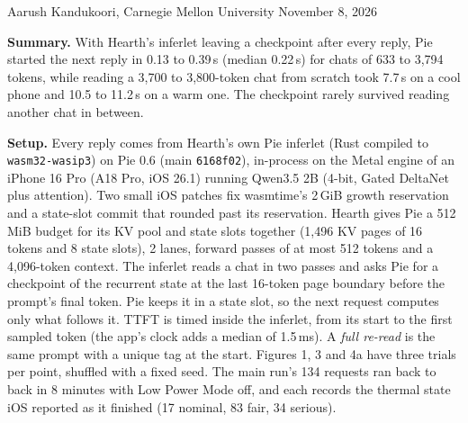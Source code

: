 \documentclass[10pt]{article}
\begin{document}
\fontsize{7.8pt}{9.1pt}\selectfont

\hfill{\scriptsize Aarush Kandukoori, Carnegie Mellon University \quad November 8, 2026}

\textbf{Summary.} With Hearth's inferlet leaving a checkpoint after every reply, Pie started the next reply in
0.13 to 0.39\,s (median 0.22\,s) for chats of
633 to 3,794 tokens, while reading a 3,700 to
3,800-token chat from scratch took 7.7\,s on a cool phone and 10.5 to 11.2\,s on a warm one. The checkpoint rarely
survived reading another chat in between.

\textbf{Setup.} Every reply comes from Hearth's own Pie inferlet (Rust compiled to \texttt{wasm32-wasip3}) on Pie 0.6
(main \texttt{6168f02}), in-process on the Metal engine of an iPhone 16 Pro (A18 Pro, iOS 26.1) running Qwen3.5 2B
(4-bit, Gated DeltaNet plus attention). Two small iOS patches fix wasmtime's 2\,GiB growth reservation
and a state-slot commit that rounded past its reservation. Hearth gives Pie a 512\,MiB budget for its
KV pool and state slots together (1,496 KV pages of 16 tokens and 8 state
slots), 2 lanes, forward passes of at most 512 tokens and a 4,096-token context. The
inferlet reads a chat in two passes and asks Pie for a checkpoint of the recurrent state at the last
16-token page boundary before the prompt's final token. Pie keeps it in a state slot, so the next request
computes only what follows it. TTFT is timed inside the inferlet, from its start to the first sampled token (the app's
clock adds a median of 1.5\,ms). A
\emph{full re-read} is the same prompt with a unique tag at the start. Figures 1, 3 and 4a have
three trials per point, shuffled with a fixed seed. The main run's 134 requests ran back to back in
8 minutes with Low Power Mode off, and each records the thermal state iOS reported as it finished
(17 nominal, 83 fair, 34 serious).
\end{document}
